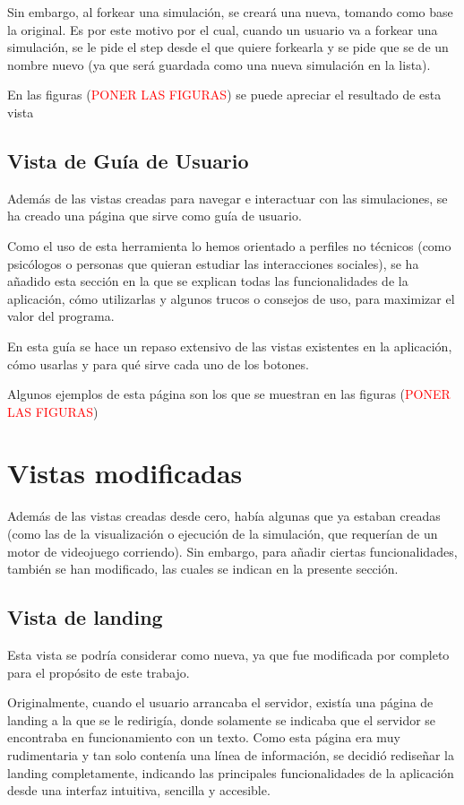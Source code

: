 Sin embargo, al forkear una simulación, se creará una nueva, tomando como base la original. Es por este motivo por el cual, cuando un usuario va a forkear una simulación, se le pide el step desde el que quiere forkearla y se pide que se de un nombre nuevo (ya que será guardada como una nueva simulación en la lista).

 En las figuras (\textcolor{red}{PONER LAS FIGURAS}) se puede apreciar el resultado de esta vista

\subsection{Vista de Guía de Usuario}

Además de las vistas creadas para navegar e interactuar con las simulaciones, se ha creado una página que sirve como guía de usuario. 

Como el uso de esta herramienta lo hemos orientado a perfiles no técnicos (como psicólogos o personas que quieran estudiar las interacciones sociales), se ha añadido esta sección en la que se explican todas las funcionalidades de la aplicación, cómo utilizarlas y algunos trucos o consejos de uso, para maximizar el valor del programa.

En esta guía se hace un repaso extensivo de las vistas existentes en la aplicación, cómo usarlas y para qué sirve cada uno de los botones.

Algunos ejemplos de esta página son los que se muestran en las figuras (\textcolor{red}{PONER LAS FIGURAS})

\section{Vistas modificadas}

Además de las vistas creadas desde cero, había algunas que ya estaban creadas (como las de la visualización o ejecución de la simulación, que requerían de un motor de videojuego corriendo). Sin embargo, para añadir ciertas funcionalidades, también se han modificado, las cuales se indican en la presente sección.

\subsection{Vista de landing}

Esta vista se podría considerar como nueva, ya que fue modificada por completo para el propósito de este trabajo.

Originalmente, cuando el usuario arrancaba el servidor, existía una página de landing a la que se le redirigía, donde solamente se indicaba que el servidor se encontraba en funcionamiento con un texto. Como esta página era muy rudimentaria y tan solo contenía una línea de información, se decidió rediseñar la landing completamente, indicando las principales funcionalidades de la aplicación desde una interfaz intuitiva, sencilla y accesible.

